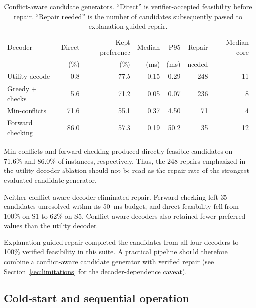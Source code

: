\documentclass[pdflatex,sn-mathphys-num,iicol,oneside]{sn-jnl}
\begin{document}
\begin{table}[t]
\centering
\caption{
Conflict-aware candidate generators. ``Direct'' is verifier-accepted
feasibility before repair. ``Repair needed'' is the number of
candidates subsequently passed to explanation-guided repair.
}
\label{tab:decoders}
\setlength{\tabcolsep}{3.5pt}
\small

\begin{tabular}{lrrrrrr}
\toprule
Decoder &
Direct &
Kept preference &
Median &
P95 &
Repair &
Median core\\
&
(\%) &
(\%) &
(ms) &
(ms) &
needed &
\\
\midrule

Utility decode
& 0.8 & 77.5 & 0.15 & 0.29 & 248 & 11\\

Greedy + checks
& 5.6 & 71.2 & 0.05 & 0.07 & 236 & 8\\

Min-conflicts
& 71.6 & 55.1 & 0.37 & 4.50 & 71 & 4\\

Forward checking
& 86.0 & 57.3 & 0.19 & 50.2 & 35 & 12\\

\bottomrule
\end{tabular}
\normalsize
\end{table}

Min-conflicts and forward checking produced directly feasible
candidates on 71.6\% and 86.0\% of instances, respectively. Thus, the
248 repairs emphasized in the utility-decoder ablation should not be
read as the repair rate of the strongest evaluated candidate
generator.

Neither conflict-aware decoder eliminated repair. Forward checking
left 35 candidates unresolved within its 50~ms budget, and direct
feasibility fell from 100\% on S1 to 62\% on S5. Conflict-aware
decoders also retained fewer preferred values than the utility
decoder.

Explanation-guided repair completed the candidates from all four
decoders to 100\% verified feasibility in this suite. A practical
pipeline should therefore combine a conflict-aware candidate generator
with verified repair (see Section~\ref{sec:limitations} for the
decoder-dependence caveat).

\subsection{Cold-start and sequential operation}
\label{sec:sequential}
\label{sec:amortized-results}
\end{document}

